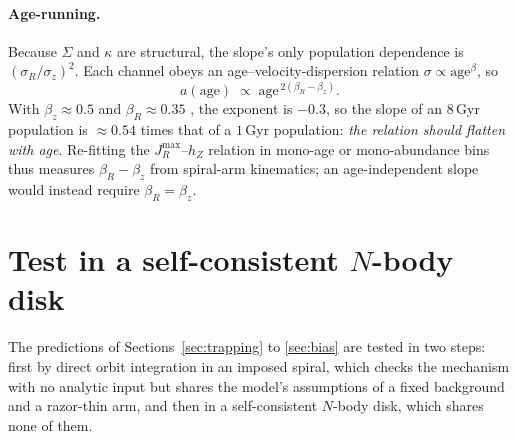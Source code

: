 \documentclass[twocolumn]{aastex701}
\newcommand{\JR}{J_R}
\newcommand{\hZ}{h_Z}
\newcommand{\sigz}{\sigma_z}
\newcommand{\sigR}{\sigma_R}
\begin{document}
\paragraph{Age-running.} Because $\Sigma$ and $\kappa$ are structural, the slope's
only population dependence is $(\sigR/\sigz)^2$. Each channel obeys an
age--velocity-dispersion relation $\sigma\propto\mathrm{age}^\beta$, so
%
\begin{equation}
  a(\mathrm{age}) \;\propto\; \mathrm{age}^{\,2(\beta_R-\beta_z)} .
  \label{eq:agerun}
\end{equation}
%
With $\beta_z\approx0.5$ and $\beta_R\approx0.35$
\citep{AumerBinneySchonrich2016,Sun2024}, the exponent is
$-0.3$, so the slope of an $8\,$Gyr population is $\approx0.54$ times that of a
$1\,$Gyr population: \emph{the relation should flatten with age}. Re-fitting the
$\JR^{\max}$--$\hZ$ relation in mono-age or mono-abundance bins thus measures
$\beta_R-\beta_z$ from spiral-arm kinematics; an age-independent slope would instead
require $\beta_R=\beta_z$.

\section{Test in a self-consistent \texorpdfstring{$N$}{N}-body disk}
\label{sec:nbody}

The predictions of Sections~\ref{sec:trapping} to \ref{sec:bias} are tested in two
steps: first by direct orbit integration in an imposed spiral, which checks the
mechanism with no analytic input but shares the model's assumptions of a fixed
background and a razor-thin arm, and then in a self-consistent $N$-body disk, which
shares none of them.
\end{document}
